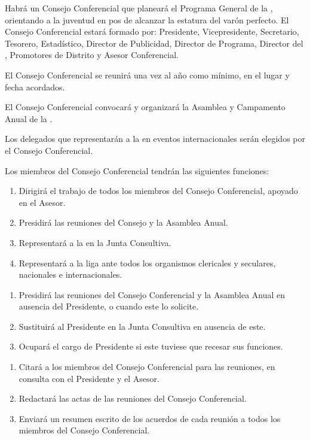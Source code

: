 
\article
Habrá un Consejo Conferencial que planeará el Programa General de la \LMJ{}, orientando a la juventud en pos de alcanzar la estatura del varón perfecto. El Consejo Conferencial estará formado por: Presidente, Vicepresidente, Secretario, Tesorero, Estadístico, Director de Publicidad, Director de Programa, Director del \OOLMJ{}, Promotores de Distrito y Asesor Conferencial.

\article
\label{reunion-consejo-conferencial}
El Consejo Conferencial se reunirá una vez al año como mínimo, en el lugar y fecha acordados.

\article
El Consejo Conferencial convocará y organizará la Asamblea y Campamento Anual de la \LMJ{}.

\article
Los delegados que representarán a la \LMJ{} en eventos internacionales serán elegidos por el Consejo Conferencial.

\article
Los miembros del Consejo Conferencial tendrán las siguientes funciones:

\begin{enumerate}[noitemsep]
    \item Dirigirá el trabajo de todos los miembros del Consejo Conferencial, apoyado en el Asesor.
    \item Presidirá las reuniones del Consejo y la Asamblea Anual.
    \item Representará a la \LMJ{} en la Junta Consultiva.
    \item Representará a la liga ante todos los organismos clericales y seculares, nacionales e internacionales.
\end{enumerate}

\begin{enumerate}[noitemsep]
    \item Presidirá las reuniones del Consejo Conferencial y la Asamblea Anual en ausencia del Presidente, o cuando este lo solicite.
    \item Sustituirá al Presidente en la Junta Consultiva en ausencia de este.
    \item Ocupará el cargo de Presidente si este tuviese que recesar sus funciones.
\end{enumerate}

\begin{enumerate}[noitemsep]
    \item Citará a los miembros del Consejo Conferencial para las reuniones, en consulta con el Presidente y el Asesor.
    \item Redactará las actas de las reuniones del Consejo Conferencial.
    \item Enviará un resumen escrito de los acuerdos de cada reunión a todos los miembros del Consejo Conferencial.
\end{enumerate}

